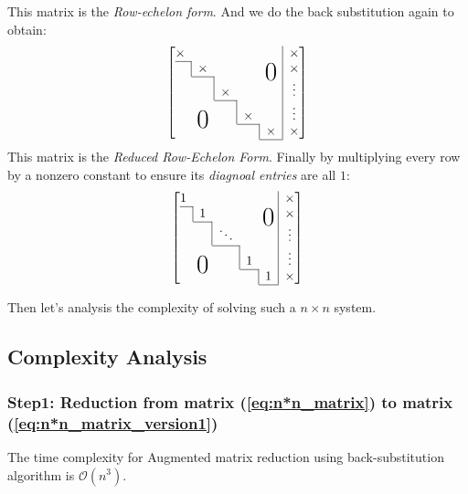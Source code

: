 \begin{example}
This matrix is the \emph{Row-echelon form}.
And we do the back substitution again to obtain:
\begin{equation}
  \left[
    \begin{array}{@{}ccccc|c@{}}
    \x    &        &     &     &  & \x\\ \cline{1-1}
    \bord & \x       &     &     & \bigzero & \x\\ \cline{2-2}
          & \bord    & \x    &     &  & \vdots \\ \cline{3-3}
          & \bigzero & \bord & \x    &  & \vdots \\ \cline{4-4}
          &          &       & \bord & \x & \x \\ \cline{5-5}
  \end{array}\right]\label{eq:n*n_matrix_version3}
\end{equation}
This matrix is the \emph{Reduced Row-Echelon Form}.
Finally by multiplying every row by a nonzero constant to ensure its \emph{diagnoal entries} are all $1$:
\begin{equation}
  \left[
    \begin{array}{@{}ccccc|c@{}}
    1    &        &     &     &  & \x\\ \cline{1-1}
    \bord & 1       &     &     & \bigzero & \x\\ \cline{2-2}
          & \bord    & \ddots    &     &  & \vdots \\ \cline{3-3}
          & \bigzero & \bord & 1    &  & \vdots \\ \cline{4-4}
          &          &       & \bord & 1 & \x \\ \cline{5-5}
  \end{array}\right]\label{eq:n*n_matrix_version4}
\end{equation}
\end{example}

Then let's analysis the complexity of solving such a $n\times n$ system.
\subsection{Complexity Analysis}
\subsubsection{Step1: Reduction from matrix (\ref{eq:n*n_matrix}) to matrix (\ref{eq:n*n_matrix_version1})}
\begin{proposition}
The time complexity for Augmented matrix reduction using back-substitution algorithm is $\mathcal{O}(n^3)$.
\end{proposition}

